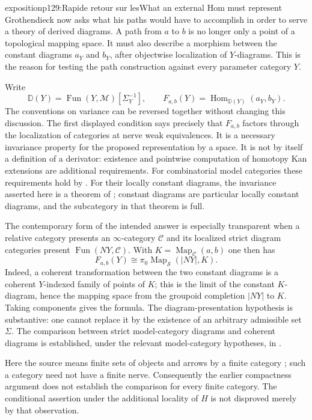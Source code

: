 \begin{dcomment}{exposition}{p129:Rapide retour sur les}{What an external Hom must represent}
Grothendieck now asks what his paths would have to accomplish in order to serve a theory of derived diagrams. A path from $a$ to $b$ is no longer only a point of a topological mapping space. It must also describe a morphism between the constant diagrams $a_Y$ and $b_Y$, after objectwise localization of $Y$-diagrams. This is the reason for testing the path construction against every parameter category $Y$.

Write
\[
 \mathbb D(Y)=\operatorname{Fun}(Y,\mathcal M)[\Sigma_Y^{-1}],
 \qquad
 F_{a,b}(Y)=\operatorname{Hom}_{\mathbb D(Y)}(a_Y,b_Y).
\]
The conventions on variance can be reversed together without changing this discussion. The first displayed condition says precisely that $F_{a,b}$ factors through the localization of categories at nerve weak equivalences. It is a necessary invariance property for the proposed representation by a space. It is not by itself a definition of a derivator: existence and pointwise computation of homotopy Kan extensions are additional requirements. For combinatorial model categories these requirements hold by \citet[Proposition~1.30]{Groth2013}. For their locally constant diagrams, the invariance asserted here is a theorem of \citet[Theorem~1.3]{Cisinski2009LocallyConstant}; constant diagrams are particular locally constant diagrams, and the subcategory in that theorem is full.

The contemporary form of the intended answer is especially transparent when a relative category presents an $\infty$-category $\mathcal C$ and its localized strict diagram categories present $\operatorname{Fun}(NY,\mathcal C)$. With $K=\operatorname{Map}_{\mathcal C}(a,b)$ one then has
\[
 F_{a,b}(Y)\cong
 \pi_0\operatorname{Map}_{\mathcal S}(|NY|,K).
\]
Indeed, a coherent transformation between the two constant diagrams is a coherent $Y$-indexed family of points of $K$; this is the limit of the constant $K$-diagram, hence the mapping space from the groupoid completion $|NY|$ to $K$. Taking components gives the formula. The diagram-presentation hypothesis is substantive: one cannot replace it by the existence of an arbitrary admissible set $\Sigma$. The comparison between strict model-category diagrams and coherent diagrams is established, under the relevant model-category hypotheses, in \citet[Proposition~4.2.4.4]{Lurie2009HTT}.

Here the source means finite sets of objects and arrows by a finite category \citep[ms.~45]{Grothendieck1990V}; such a category need not have a finite nerve. Consequently the earlier compactness argument does not establish the comparison for every finite category. The conditional assertion under the additional locality of $H$ is not disproved merely by that observation.


\end{dcomment}
